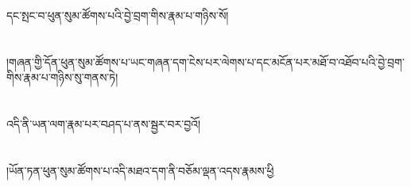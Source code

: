 དང་སྤང་བ་ཕུན་སུམ་ཚོགས་པའི་བྱེ་བྲག་གིས་རྣམ་པ་གཉིས་སོ།\chapter{ }།གཞན་གྱི་དོན་ཕུན་སུམ་ཚོགས་པ་ཡང་གཞན་དག་ངེས་པར་ལེགས་པ་དང་མངོན་པར་མཐོ་བ་འཐོབ་པའི་བྱེ་བྲག་གིས་རྣམ་པ་གཉིས་སུ་གནས་ཏེ།\chapter{ }འདི་ནི་ཡན་ལག་རྣམ་པར་བཤད་པ་ནས་སྦྱར་བར་བྱའོ།\chapter{ }།ཡོན་ཏན་ཕུན་སུམ་ཚོགས་པ་འདི་མཐའ་དག་ནི་བཅོམ་ལྡན་འདས་རྣམས་ཕྱི